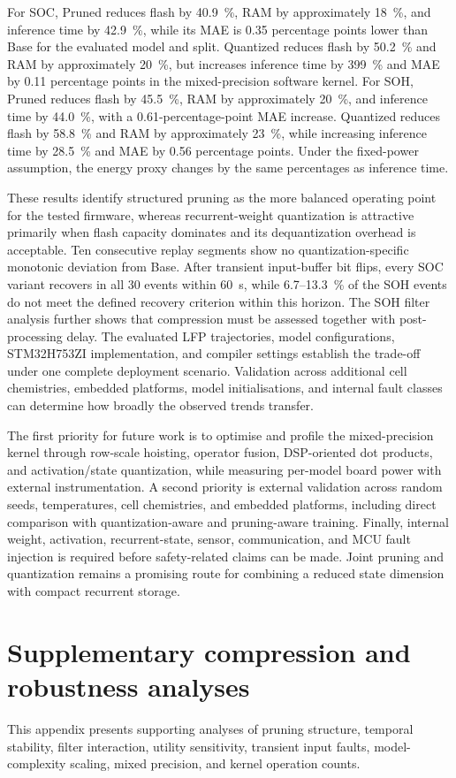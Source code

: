\documentclass[final,3p,times]{elsarticle}
\begin{document}
For SOC, Pruned reduces flash by 40.9~\%, RAM by approximately 18~\%, and inference time by 42.9~\%, while its MAE is 0.35 percentage points lower than Base for the evaluated model and split. Quantized reduces flash by 50.2~\% and RAM by approximately 20~\%, but increases inference time by 399~\% and MAE by 0.11 percentage points in the mixed-precision software kernel. For SOH, Pruned reduces flash by 45.5~\%, RAM by approximately 20~\%, and inference time by 44.0~\%, with a 0.61-percentage-point MAE increase. Quantized reduces flash by 58.8~\% and RAM by approximately 23~\%, while increasing inference time by 28.5~\% and MAE by 0.56 percentage points. Under the fixed-power assumption, the energy proxy changes by the same percentages as inference time.

These results identify structured pruning as the more balanced operating point for the tested firmware, whereas recurrent-weight quantization is attractive primarily when flash capacity dominates and its dequantization overhead is acceptable. Ten consecutive replay segments show no quantization-specific monotonic deviation from Base. After transient input-buffer bit flips, every SOC variant recovers in all 30 events within 60~s, while 6.7--13.3~\% of the SOH events do not meet the defined recovery criterion within this horizon. The SOH filter analysis further shows that compression must be assessed together with post-processing delay. The evaluated LFP trajectories, model configurations, STM32H753ZI implementation, and compiler settings establish the trade-off under one complete deployment scenario. Validation across additional cell chemistries, embedded platforms, model initialisations, and internal fault classes can determine how broadly the observed trends transfer.

The first priority for future work is to optimise and profile the mixed-precision kernel through row-scale hoisting, operator fusion, DSP-oriented dot products, and activation/state quantization, while measuring per-model board power with external instrumentation. A second priority is external validation across random seeds, temperatures, cell chemistries, and embedded platforms, including direct comparison with quantization-aware and pruning-aware training. Finally, internal weight, activation, recurrent-state, sensor, communication, and MCU fault injection is required before safety-related claims can be made. Joint pruning and quantization remains a promising route for combining a reduced state dimension with compact recurrent storage.
\appendix
\section{Supplementary compression and robustness analyses}\label{app:supplementary}
This appendix presents supporting analyses of pruning structure, temporal stability, filter interaction, utility sensitivity, transient input faults, model-complexity scaling, mixed precision, and kernel operation counts.
\end{document}
